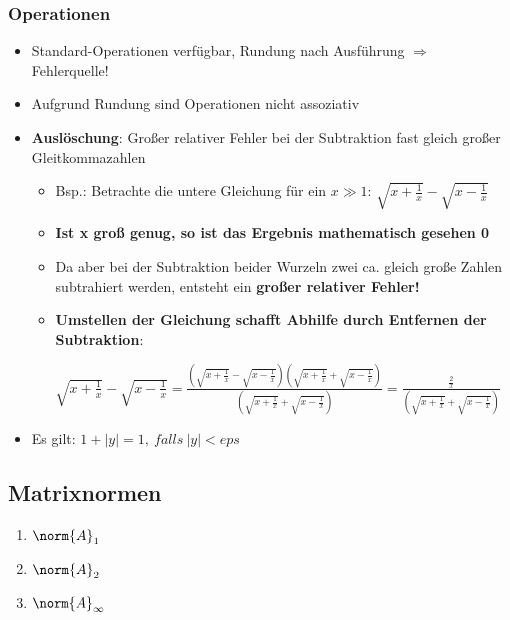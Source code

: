 \subsubsection{Operationen}%
\label{gl:ssub:operationen}
\begin{itemize}
	\item Standard-Operationen verfügbar, Rundung nach Ausführung $\Rightarrow$ Fehlerquelle!
	\item Aufgrund Rundung sind Operationen nicht assoziativ
	\item \textbf{Auslöschung}: Großer relativer Fehler bei der Subtraktion fast gleich großer Gleitkommazahlen
	\begin{itemize}
		\item Bsp.: Betrachte die untere Gleichung für ein $x \gg 1$: $\sqrt{x + \frac{1}{x}} - \sqrt{x - \frac{1}{x}}$
		\item \textbf{Ist x groß genug, so ist das Ergebnis mathematisch gesehen 0}
		\item Da aber bei der Subtraktion beider Wurzeln zwei ca. gleich große Zahlen subtrahiert werden, entsteht ein \textbf{großer relativer Fehler!}
		\item \textbf{Umstellen der Gleichung schafft Abhilfe durch Entfernen der Subtraktion}:
		\begin{center}
			$\sqrt{x + \frac{1}{x}} - \sqrt{x - \frac{1}{x}}
			= \frac{(\sqrt{x + \frac{1}{x}} - \sqrt{x - \frac{1}{x}})(\sqrt{x + \frac{1}{x}} + \sqrt{x - \frac{1}{x}})}{(\sqrt{x + \frac{1}{x}} + \sqrt{x - \frac{1}{x}})}
			= \frac{\frac{2}{x}}{(\sqrt{x + \frac{1}{x}} + \sqrt{x - \frac{1}{x}})}$
		\end{center}
	\end{itemize}
	\item Es gilt: $1 + |y| = 1,\ falls\ |y| < eps$
\end{itemize}

\subsection{Matrixnormen}%
\label{gl:sub:matrixnormen}
\begin{enumerate}
	\item{ $\norm{A}_1$}
	\item{ $\norm{A}_2$}
	\item{ $\norm{A}_\infty$}
\end{enumerate}

